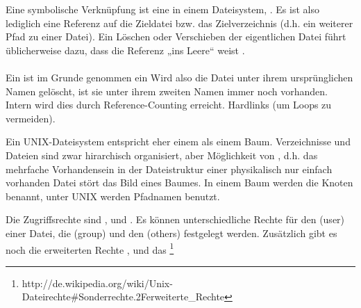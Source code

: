 \begin{answer}
Eine symbolische Verknüpfung ist eine  in einem Dateisystem, . Es ist also lediglich eine Referenz auf die Zieldatei bzw. das Zielverzeichnis (d.h. ein weiterer Pfad zu einer Datei). Ein Löschen oder Verschieben der eigentlichen Datei führt üblicherweise dazu, dass die Referenz „ins Leere“ weist .

\paragraph*{}
Ein  ist im Grunde genommen ein  Wird also die Datei unter ihrem ursprünglichen Namen gelöscht, ist sie unter ihrem zweiten Namen immer noch vorhanden. Intern wird dies durch Reference-Counting erreicht. Hardlinks  (um Loops zu vermeiden).
\end{answer}

\begin{answer}
Ein UNIX-Dateisystem entspricht eher einem  als einem Baum. Verzeichnisse und Dateien sind zwar hirarchisch organisiert, aber Möglichkeit von , d.h. das mehrfache Vorhandensein in der Dateistruktur einer physikalisch nur einfach vorhanden Datei stört das Bild eines Baumes. In einem Baum werden die Knoten benannt, unter UNIX werden Pfadnamen benutzt.
\end{answer}

\begin{answer}
Die Zugriffsrechte sind ,  und .
Es können unterschiedliche Rechte für den  (user) einer Datei, die  (group) und den  (others) festgelegt werden. Zusätzlich gibt es noch die erweiterten Rechte ,  und das \footnote{http://de.wikipedia.org/wiki/Unix-Dateirechte\#Sonderrechte.2Ferweiterte\_Rechte}

\end{answer}

